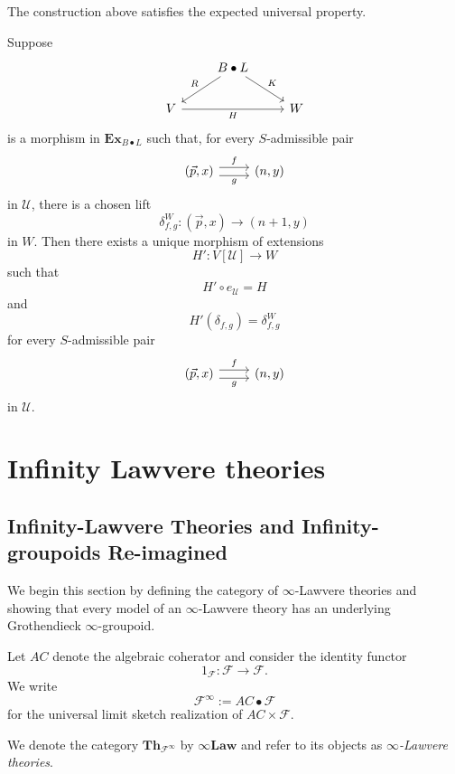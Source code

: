 \documentclass{tac}
\begin{document}
The construction above satisfies the expected universal property.

\begin{lemma}\label{uni_prop_of_ext}
Suppose
\[
\begin{tikzcd}
&B\bullet L\ar[ld,swap,"R"]\ar[dr,"K"]&\\
V\ar[rr,swap,"H"]&&W
\end{tikzcd}
\]
is a morphism in $\mathbf{Ex}_{B\bullet L}$ such that, for every $S$-admissible pair
\[
\begin{tikzcd}
(\vec{p},x)\ar[r,shift left=.75ex,"f"]
\ar[r,shift right=.75ex,swap,"g"]&
(n,y)
\end{tikzcd}
\]
in $\mathcal{U}$, there is a chosen lift
\[
\delta^W_{f,g}:(\vec{p},x)\to(n+1,y)
\]
in $W$. Then there exists a unique morphism of extensions
\[
H':V[\mathcal{U}]\to W
\]
such that
\[
H'\circ e_\mathcal{U}=H
\]
and
\[
H'(\delta_{f,g})=\delta^W_{f,g}
\]
for every $S$-admissible pair
\[
\begin{tikzcd}
(\vec{p},x)\ar[r,shift left=.75ex,"f"]
\ar[r,shift right=.75ex,swap,"g"]&
(n,y)
\end{tikzcd}
\]
in $\mathcal{U}$.
\end{lemma}


\section{Infinity Lawvere theories}\label{inf_Law_Chapter}
\subsection*{Infinity-Lawvere Theories and Infinity-groupoids Re-imagined}\label{Inf_Law_Th_in}
We begin this section by defining the category of $\infty$-Lawvere theories and showing that every model of an $\infty$-Lawvere theory has an underlying Grothendieck $\infty$-groupoid.

\begin{notation}
Let $AC$ denote the algebraic coherator and consider the identity functor
\[
1_{\mathcal{F}}:\mathcal{F}\to\mathcal{F}.
\]
We write
\[
\mathcal{F}^\infty:=AC\bullet\mathcal{F}
\]
for the universal limit sketch realization of $AC\times\mathcal{F}$.
\end{notation}

\begin{notation}\label{def_of_inf_Law_Th}
We denote the category $\mathbf{Th}_{\mathcal{F}^\infty}$ by $\infty\mathbf{Law}$ and refer to its objects as \emph{$\infty$-Lawvere theories}.
\end{notation}
\end{document}
